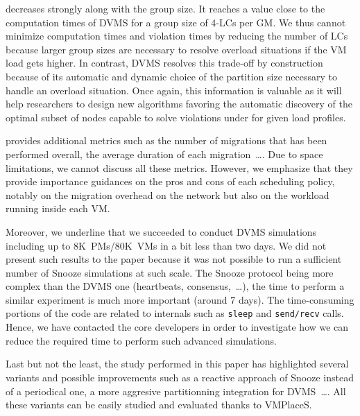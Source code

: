 decreases strongly along with the group
size. It reaches a value close to the computation times of DVMS for a
group size of 4-LCs per GM.%
We thus cannot minimize computation times and violation times by
reducing the number of LCs because larger group sizes are necessary to
resolve overload situations if the VM load gets higher.
In contrast, DVMS resolves this trade-off by construction because of its
automatic and dynamic choice of the partition size necessary to handle
an overload situation.
Once again,
this information is valuable as it will help researchers to design new
algorithms favoring the automatic discovery of the optimal subset of
nodes capable to solve violations under for given load profiles.

\vmps provides additional metrics such as the number of migrations
that has been performed overall, the average duration of each
migration~\ldots. Due to space limitations, we cannot discuss all
these metrics. However, we emphasize that they provide importance
guidances on the pros and cons of each scheduling policy, notably on
the migration overhead on the network but
also on the workload running inside each VM.

Moreover,  we underline that we succeeded to conduct DVMS simulations including
up to 8K~PMs/80K~VMs in a bit less than two days. We did not present
such results to the paper because it was not possible to run a
sufficient number of Snooze simulations at such scale. The Snooze
protocol being more complex than the DVMS one (heartbeats,
consensus,~\ldots), the time to perform a similar experiment is much
more important (around 7 days). The time-consuming portions of the
code are related to \sg internals such as \texttt{sleep} and
\texttt{send/recv} calls. Hence, we have contacted the \sg core
developers in order to investigate how we can reduce the required time
to perform such advanced simulations.

Last but not the least, the study performed in this paper has
highlighted several variants and possible improvements such as a
reactive approach of Snooze instead of a periodical one, a more
aggresive partitionning integration for DVMS~\ldots. All these
variants can be easily studied and evaluated
thanks to VMPlaceS.
